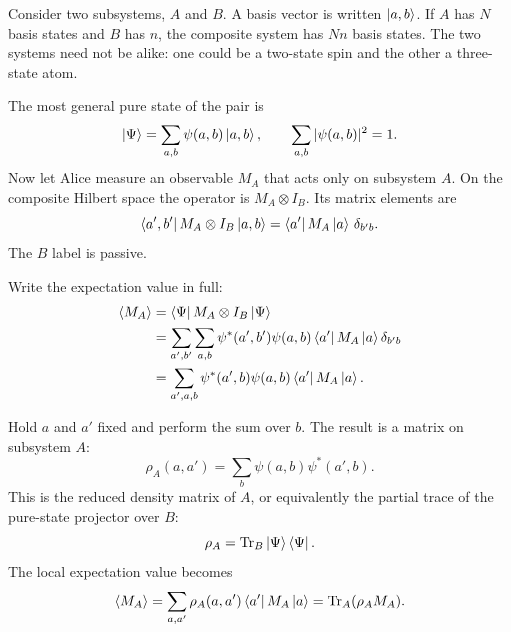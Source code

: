 Consider two subsystems, \(A\) and \(B\). A basis vector is written \(\left\lvert a,b\right\rangle\). If \(A\) has \(N\) basis states and \(B\) has \(n\), the composite system has \(Nn\) basis states. The two systems need not be alike: one could be a two-state spin and the other a three-state atom.

The most general pure state of the pair is
\begin{equation}
\left\lvert\Psi\right\rangle
=\sum_{a,b}\psi(a,b)\left\lvert a,b\right\rangle,
\qquad
\sum_{a,b}|\psi(a,b)|^2=1.
\end{equation}
Now let Alice measure an observable \(M_A\) that acts only on subsystem \(A\). On the composite Hilbert space the operator is \(M_A\otimes I_B\). Its matrix elements are
\begin{equation}
\left\langle a',b'\right\rvert M_A\otimes I_B\left\lvert a,b\right\rangle
=\left\langle a'\right\rvert M_A\left\lvert a\right\rangle\,\delta_{b'b}.
\end{equation}
The \(B\) label is passive.

Write the expectation value in full:
\begin{align}
\left\langle M_A\right\rangle
&=\left\langle\Psi\right\rvert M_A\otimes I_B\left\lvert\Psi\right\rangle \\
&=\sum_{a',b'}\sum_{a,b}
\psi^*(a',b')\psi(a,b)
\left\langle a'\right\rvert M_A\left\lvert a\right\rangle\delta_{b'b} \\
&=\sum_{a',a,b}
\psi^*(a',b)\psi(a,b)
\left\langle a'\right\rvert M_A\left\lvert a\right\rangle.
\end{align}

\begin{classroomqa}
\end{classroomqa}

Hold \(a\) and \(a'\) fixed and perform the sum over \(b\). The result is a matrix on subsystem \(A\):
\begin{equation}
\boxed{
\rho_A(a,a')
=\sum_b\psi(a,b)\psi^*(a',b)
}.
\end{equation}
This is the reduced density matrix of \(A\), or equivalently the partial trace of the pure-state projector over \(B\):
\begin{equation}
\rho_A=\operatorname{Tr}_B\left\lvert\Psi\right\rangle\left\langle\Psi\right\rvert.
\end{equation}
The local expectation value becomes
\begin{equation}
\left\langle M_A\right\rangle
=\sum_{a,a'}\rho_A(a,a')\left\langle a'\right\rvert M_A\left\lvert a\right\rangle
=\operatorname{Tr}_A(\rho_A M_A).
\end{equation}


